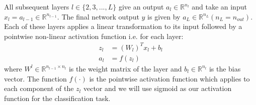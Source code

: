 All subsequent layers $l \in \{2,3,...,L\}$ give an output $a_l \in \mathbb{R}^{n_{l}}$ and take an input $x_l = a_{l-1} \in \mathbb{R}^{n_{l-1}}$. The final network output $y$ is given by $a_L \in \mathbb{R}^{n_L} (n_L = n_{out})$.
Each of these layers applies a linear transformation to its input followed by a pointwise non-linear activation function i.e. for each layer:
\begin{align}
z_l &= (W_l)^T x_l + b_l \\
a_l &= f(z_l)
\end{align}
where $W^l \in \mathbb{R}^{n_{l-1} \times n_l}$ is the weight matrix of the layer and $b_l \in \mathbb{R}^{n_l}$ is the bias vector. The function $f(\cdot)$ is the pointwise activation function which applies to each component of the $z_l$ vector and we will use sigmoid as our activation function for the classification task.
